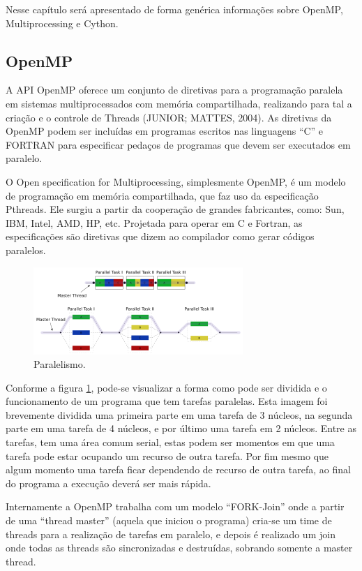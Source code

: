 \documentclass[a4paper,12pt]{article}
\begin{document}
Nesse capítulo será apresentado de forma genérica informações sobre OpenMP, Multiprocessing e Cython. 
\subsection{OpenMP}

A API OpenMP oferece um conjunto de diretivas para a programação paralela em sistemas multiprocessados com memória compartilhada, realizando para tal a criação e o controle de Threads (JUNIOR; MATTES, 2004). As diretivas da OpenMP podem ser incluídas em programas escritos nas linguagens “C” e FORTRAN para especificar pedaços de programas que devem ser executados em paralelo.

O Open specification for Multiprocessing, simplesmente OpenMP, é um modelo de programação em memória compartilhada, que faz uso da especificação Pthreads. Ele surgiu a partir da cooperação de grandes fabricantes, como: Sun, IBM, Intel, AMD, HP, etc. Projetada para operar em C e Fortran, as especificações são diretivas que dizem ao compilador como gerar códigos paralelos. 


\begin{figure}[!htb]
  \centering
  \includegraphics{pictures/openMP.jpg}
  \caption{Paralelismo.}
\label{fig:parallel}
\end{figure}

Conforme a figura \ref{fig:parallel}, pode-se visualizar a forma como pode ser dividida e o funcionamento de um programa que tem tarefas paralelas. Esta imagem foi brevemente dividida uma primeira parte em uma tarefa de 3 núcleos, na segunda parte em uma tarefa de 4 núcleos, e por último uma tarefa em 2 núcleos. Entre as tarefas, tem uma área comum serial, estas podem ser momentos em que uma tarefa pode estar ocupando um recurso de outra tarefa. Por fim mesmo que algum momento uma tarefa ficar dependendo de recurso de outra tarefa, ao final do programa a execução deverá ser mais rápida.

Internamente a OpenMP trabalha com um modelo “FORK-Join” onde a partir de uma
“thread master” (aquela que iniciou o programa) cria-se um time de threads para a
realização de tarefas em paralelo, e depois é realizado um join onde todas as threads
são sincronizadas e destruídas, sobrando somente a master thread.
\end{document}
